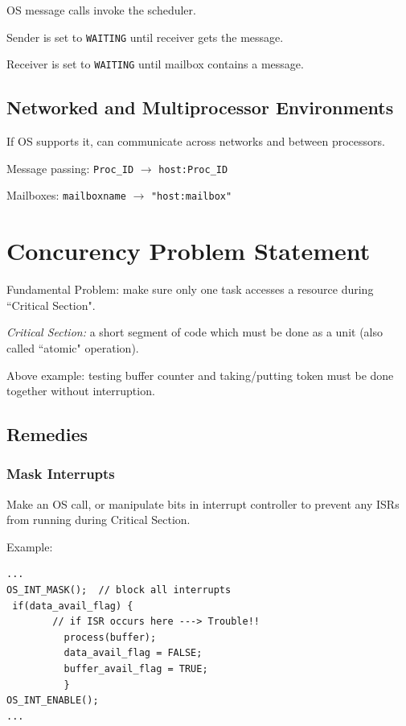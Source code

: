 \documentclass{article}	%
\begin{document}
OS message calls invoke the scheduler.

Sender is set to {\tt WAITING} until receiver gets the message.

Receiver is set to {\tt WAITING} until mailbox contains a message.

\subsection{Networked and Multiprocessor Environments}
If OS supports it, can communicate across networks and between processors.

Message passing:    {\tt Proc\_ID} $\to$ {\tt host:Proc\_ID}

Mailboxes:     {\tt mailboxname} $\to$ {\tt "host:mailbox" }




\section{Concurency Problem Statement}

Fundamental Problem: make sure only one task accesses a resource
during ``Critical Section".

{\it Critical Section: } a short segment of code which must be done
as a unit (also called ``atomic" operation).

Above example: testing buffer counter and taking/putting token
must be done together without interruption.



\subsection{Remedies}

\subsubsection{ Mask Interrupts}

Make an OS call, or manipulate bits in interrupt controller
to prevent any ISRs from running during Critical Section.

Example:
\begin{verbatim}
...
OS_INT_MASK();  // block all interrupts
 if(data_avail_flag) {
        // if ISR occurs here ---> Trouble!!
          process(buffer);
          data_avail_flag = FALSE;
          buffer_avail_flag = TRUE;
          }
OS_INT_ENABLE();
...
\end{verbatim}
\end{document}
